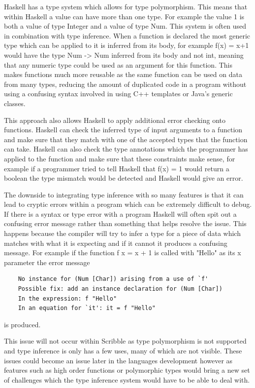 \documentclass[]{final_report}
\begin{document}
Haskell has a type system which allows for type polymorphism. This means that within Haskell a value can have more than one type. For example the value 1 is both a value of type Integer and a value of type Num. This system is often used in combination with type inference. When a function is declared the most generic type which can be applied to it is inferred from its body, for example f(x) = x+1 would have the type Num -> Num inferred from its body and not int, meaning that any numeric type could be used as an argument for this function. This makes functions much more reusable as the same function can be used on data from many types, reducing the amount of duplicated code in a program without using a confusing syntax involved in using C++ templates or Java's generic classes.
 
This approach also allows Haskell to apply additional error checking onto functions. Haskell can check the inferred type of input arguments to a function and make sure that they match with one of the accepted types that the function can take. Haskell can also check the type annotations which the programmer has applied to the function and make sure that these constraints make sense, for example if a programmer tried to tell Haskell that f(x) = 1 would return a boolean the type mismatch would be detected and Haskell would give an error.

The downside to integrating type inference with so many features is that it can lead to cryptic errors within a program which can be extremely difficult to debug. If there is a syntax or type error with a program Haskell will often spit out a confusing error message rather than something that helps resolve the issue. This happens because the compiler will try to infer a type for a piece of data which matches with what it is expecting and if it cannot it produces a confusing message. For example if the function f x = x + 1 is called with "Hello" as its x parameter the error message
\begin{verbatim}
    No instance for (Num [Char]) arising from a use of `f'
    Possible fix: add an instance declaration for (Num [Char])
    In the expression: f "Hello"
    In an equation for `it': it = f "Hello"
\end{verbatim}
is produced. 

This issue will not occur within Scribble as type polymorphism is not supported and type inference is only has a few uses, many of which are not visible. These issues could become an issue later in the languages development however as features such as high order functions or polymorphic types would bring a new set of challenges which the type inference system would have to be able to deal with.
\end{document}
